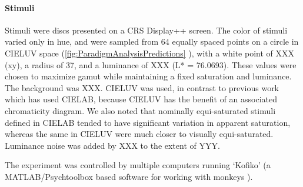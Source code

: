 \paragraph{Stimuli} 

Stimuli were discs presented on a CRS Display++ screen.
The color of stimuli varied only in hue, and were sampled from 64 equally spaced points on a circle in CIELUV space (\autoref{fig:ParadigmAnalysisPredictions}%
), with a white point of XXX (xy), a radius of 37, and a luminance of XXX (L* = 76.0693). 
These values were chosen to maximize gamut while maintaining a fixed saturation and luminance. 
The background was XXX.
CIELUV was used, in contrast to previous work which has used CIELAB, because CIELUV has the benefit of an associated chromaticity diagram. 
We also noted that nominally equi-saturated stimuli defined in CIELAB tended to have significant variation in apparent saturation, whereas the same in CIELUV were much closer to visually equi-saturated. 
Luminance noise was added by XXX to the extent of YYY.

The experiment was controlled by multiple computers running `Kofiko' (a MATLAB/Psychtoolbox based software for working with monkeys %
).

